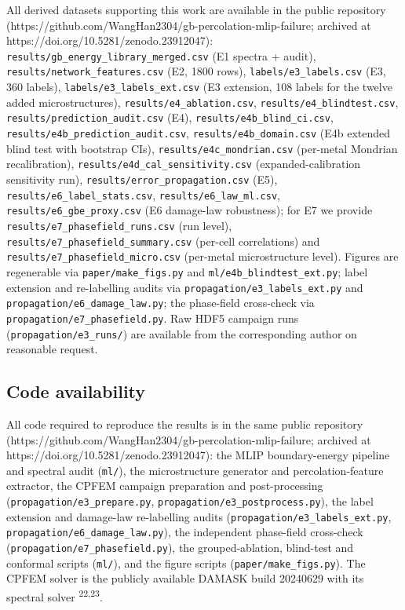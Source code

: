 \documentclass[11pt]{article}
\begin{document}
{\sloppy
All derived datasets supporting this work are available in the public repository (\mbox{https://github.com/WangHan2304/gb-percolation-mlip-failure}; archived at \mbox{https://doi.org/10.5281/zenodo.23912047}): \texttt{results/gb\_energy\_library\_merged.csv} (E1 spectra + audit), \texttt{results/network\_features.csv} (E2, 1800 rows), \texttt{labels/e3\_labels.csv} (E3, 360 labels), \texttt{labels/e3\_labels\_ext.csv} (E3 extension, 108 labels for the twelve added microstructures), \texttt{results/e4\_ablation.csv}, \texttt{results/e4\_blindtest.csv}, \texttt{results/prediction\_audit.csv} (E4), \texttt{results/e4b\_blind\_ci.csv}, \texttt{results/e4b\_prediction\_audit.csv}, \texttt{results/e4b\_domain.csv} (E4b extended blind test with bootstrap CIs), \texttt{results/e4c\_mondrian.csv} (per-metal Mondrian recalibration), \texttt{results/e4d\_cal\_sensitivity.csv} (expanded-calibration sensitivity run), \texttt{results/error\_propagation.csv} (E5), \texttt{results/e6\_label\_stats.csv}, \texttt{results/e6\_law\_ml.csv}, \texttt{results/e6\_gbe\_proxy.csv} (E6 damage-law robustness); for E7 we provide \texttt{results/e7\_phasefield\_runs.csv} (run level), \texttt{results/e7\_phasefield\_summary.csv} (per-cell correlations) and \texttt{results/e7\_phasefield\_micro.csv} (per-metal microstructure level). Figures are regenerable via \texttt{paper/make\_figs.py} and \texttt{ml/e4b\_blindtest\_ext.py}; label extension and re-labelling audits via \texttt{propagation/e3\_labels\_ext.py} and \texttt{propagation/e6\_damage\_law.py}; the phase-field cross-check via \texttt{propagation/e7\_phasefield.py}. Raw HDF5 campaign runs (\texttt{propagation/e3\_runs/}) are available from the corresponding author on reasonable request.\par}

\subsection*{Code availability}

{\sloppy
All code required to reproduce the results is in the same public repository (\mbox{https://github.com/WangHan2304/gb-percolation-mlip-failure}; archived at \mbox{https://doi.org/10.5281/zenodo.23912047}): the MLIP boundary-energy pipeline and spectral audit (\texttt{ml/}), the microstructure generator and percolation-feature extractor, the CPFEM campaign preparation and post-processing (\texttt{propagation/e3\_prepare.py}, \texttt{propagation/e3\_postprocess.py}), the label extension and damage-law re-labelling audits (\texttt{propagation/e3\_labels\_ext.py}, \texttt{propagation/e6\_damage\_law.py}), the independent phase-field cross-check (\texttt{propagation/e7\_phasefield.py}), the grouped-ablation, blind-test and conformal scripts (\texttt{ml/}), and the figure scripts (\texttt{paper/make\_figs.py}). The CPFEM solver is the publicly available DAMASK build 20240629 with its spectral solver \textsuperscript{22,23}.\par}
\end{document}
